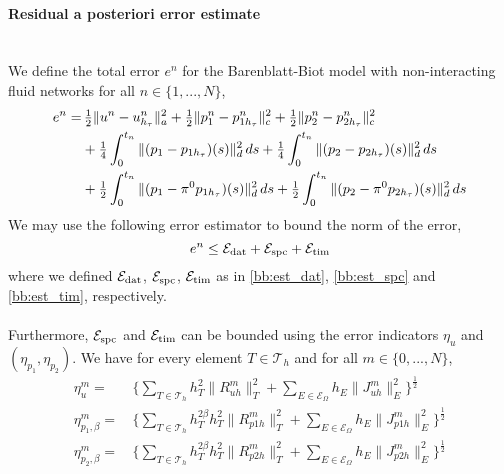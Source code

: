 \paragraph{Residual a posteriori error estimate} \label{bb_case1_final_estimate}\mbox{} \\
We define the total error $e^n$ for the Barenblatt-Biot model with non-interacting fluid networks for all $n \in \{1,...,N \}$,
\\
\begin{align} \label{bb:error}
e^n = & \, \tfrac{1}{2}\|u^n - u^n_{h_\tau} \|^2_a + \tfrac{1}{2}\|p_1^n - p^n_{1h_\tau} \|^2_c + \tfrac{1}{2}\|p_2^n - p^n_{2h_\tau} \|^2_c \\
&+ \tfrac{1}{4}\int_0^{t_n} \|(p_1 - p_{1h_\tau})(s) \|^2_d \, ds 
+ \tfrac{1}{4}\int_0^{t_n} \|(p_2 - p_{2h_\tau})(s) \|^2_d \, ds \notag\\
& + \tfrac{1}{2}\int_0^{t_n} \|(p_1 - \pi^0p_{1h_\tau})(s) \|^2_d \, ds 
+ \tfrac{1}{2}\int_0^{t_n} \|(p_2 - \pi^0p_{2h_\tau})(s) \|^2_d \, ds \notag
\end{align}
We may use the following error estimator to bound the norm of the error,
\begin{equation} \label{bb:error_up_bd}
e^n \leq \mathcal{E}_{\textnormal{dat}} + \mathcal{E}_{\textnormal{spc}} + \mathcal{E}_{\textnormal{tim}} 
\end{equation}
where we defined $\mathcal{E}_{\textnormal{dat}}$, $\mathcal{E}_{\textnormal{spc}}$, $\mathcal{E}_{\textnormal{tim}}$ as in \eqref{bb:est_dat}, \eqref{bb:est_spc} and \eqref{bb:est_tim}, respectively.
\\
\\
Furthermore, $\mathcal{E}_{\textnormal{spc}}$ and $\mathcal{E}_{\textnormal{tim}}$ can be bounded using the error indicators $\eta_u$ and $(\eta_{p_1}, \eta_{p_2})$. We have for every element $T \in \mathcal{T}_h$ and for all $m \in \{0,...,N\}$,
\begin{align} \label{bb_error_indicators1}
\eta^m_u = & \,\bigl\{\sum_{T \in \mathcal{T}_h} h_T^2 \|R^m_{uh}\|_T^2 + \sum_{E \in \mathcal{E}_\Omega} h_E \|J^m_{uh}\|_E^2 \bigr\}^{\frac{1}{2}} \\
\eta^m_{p_1,\beta} = & \, \bigl\{\sum_{T \in \mathcal{T}_h} h_T^{2\beta} h_T^2 \|R^m_{p1h}\|_T^2  + \sum_{E \in \mathcal{E}_\Omega} h_E \|J^m_{p1h}\|_E^2 \bigr\}^{\frac{1}{2}} \label{bb_error_indicators2a}\\
\eta^m_{p_2,\beta} = & \, \bigl\{\sum_{T \in \mathcal{T}_h} h_T^{2\beta} h_T^2 \|R^m_{p2h}\|_T^2  + \sum_{E \in \mathcal{E}_\Omega} h_E \|J^m_{p2h}\|_E^2 \bigr\}^{\frac{1}{2}} \label{bb_error_indicators2b}
\end{align}
